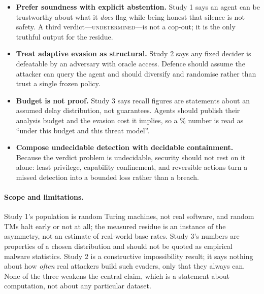 \documentclass[11pt]{article}
\theoremstyle{plain}
\theoremstyle{definition}
\begin{document}
\begin{itemize}[leftmargin=1.4em,itemsep=3pt]
  \item \textbf{Prefer soundness with explicit abstention.} Study 1 says an
  agent can be trustworthy about what it \emph{does} flag while being honest
  that silence is not safety. A third verdict---\textsc{undetermined}---is not
  a cop-out; it is the only truthful output for the residue.
  \item \textbf{Treat adaptive evasion as structural.} Study 2 says any fixed
  decider is defeatable by an adversary with oracle access. Defence should
  assume the attacker can query the agent and should diversify and randomise
  rather than trust a single frozen policy.
  \item \textbf{Budget is not proof.} Study 3 says recall figures are
  statements about an assumed delay distribution, not guarantees. Agents should
  publish their analysis budget and the evasion cost it implies, so a
  \expSbRecall\% number is read as ``under this budget and this threat model''.
  \item \textbf{Compose undecidable detection with decidable containment.}
  Because the verdict problem is undecidable, security should not rest on it
  alone: least privilege, capability confinement, and reversible actions turn
  a missed detection into a bounded loss rather than a breach.
\end{itemize}

\paragraph{Scope and limitations.}
Study 1's population is random Turing machines, not real software, and random
TMs halt early or not at all; the measured residue is an instance of the
asymmetry, not an estimate of real-world base rates. Study 3's numbers are
properties of a chosen distribution and should not be quoted as empirical
malware statistics. Study 2 is a constructive impossibility result; it says
nothing about how \emph{often} real attackers build such evaders, only that
they always can. None of the three weakens the central claim, which is a
statement about computation, not about any particular dataset.
\end{document}
